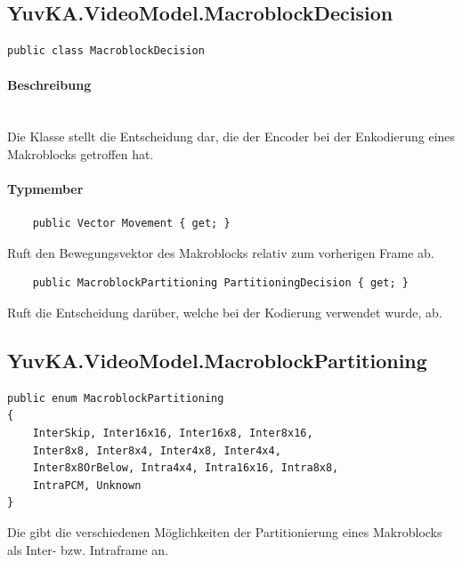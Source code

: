 \subsection{YuvKA.VideoModel.MacroblockDecision}

\begin{verbatim}
public class MacroblockDecision
\end{verbatim}

\paragraph{Beschreibung}~\\
Die Klasse  stellt die Entscheidung dar, die der Encoder bei der Enkodierung eines Makroblocks getroffen hat.

\paragraph{Typmember}
\begin{itemize}

	\begin{verbatim}
	public Vector Movement { get; }
	\end{verbatim}
	Ruft den Bewegungsvektor des Makroblocks relativ zum vorherigen Frame ab.

	\begin{verbatim}
	public MacroblockPartitioning PartitioningDecision { get; }
	\end{verbatim}
	Ruft die Entscheidung darüber, welche  bei der Kodierung verwendet wurde, ab.

\end{itemize}

\subsection{YuvKA.VideoModel.MacroblockPartitioning}

\begin{verbatim}
public enum MacroblockPartitioning
{
    InterSkip, Inter16x16, Inter16x8, Inter8x16,
    Inter8x8, Inter8x4, Inter4x8, Inter4x4,
    Inter8x8OrBelow, Intra4x4, Intra16x16, Intra8x8,
    IntraPCM, Unknown
}
\end{verbatim}
Die  gibt die verschiedenen Möglichkeiten der Partitionierung eines Makroblocks als Inter- bzw. Intraframe an.
